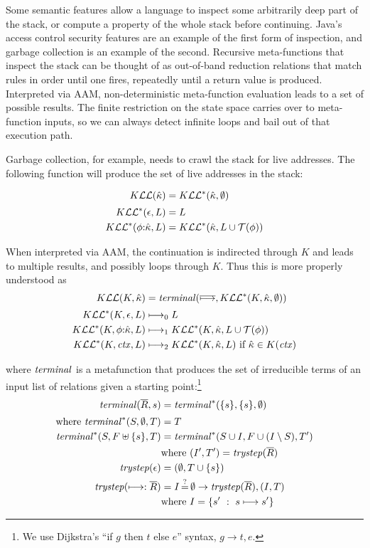 Some semantic features allow a language to inspect some arbitrarily deep part of the stack, or compute a property of the whole stack before continuing.
%
Java's access control security features are an example of the first form of inspection, and garbage collection is an example of the second.
%
Recursive meta-functions that inspect the stack can be thought of as out-of-band reduction relations that match rules in order until one fires, repeatedly until a return value is produced.
%
Interpreted via AAM, non-deterministic meta-function evaluation leads to a set of possible results.
%
The finite restriction on the state space carries over to meta-function inputs, so we can always detect infinite loops and bail out of that execution path.

Garbage collection, for example, needs to crawl the stack for live addresses.
The following function will produce the set of live addresses in the stack:

\begin{align*}
  K{\mathcal L}{\mathcal L}(\hat{\kappa}) &= K{\mathcal L}{\mathcal L}^*(\hat{\kappa},\emptyset) \\[2pt]
  K{\mathcal L}{\mathcal L}^*(\epsilon,L) &= L \\
  K{\mathcal L}{\mathcal L}^*(\phi{\tt :} \hat{\kappa}, L) &= K{\mathcal L}{\mathcal L}^*(\hat{\kappa}, L\cup{\mathcal T}(\phi))
\end{align*}

When interpreted via AAM, the continuation is indirected through $K$ and leads to multiple results, and possibly loops through $K$.
%
Thus this is more properly understood as
\begin{align*}
  K{\mathcal L}{\mathcal L}(K,\hat{\kappa}) &= \mathit{terminal}(\overline{\longmapsto},K{\mathcal L}{\mathcal L}^*(K,\hat{\kappa},\emptyset)) \\[2pt]
  K{\mathcal L}{\mathcal L}^*(K,\epsilon,L) &\longmapsto_0 L \\
  K{\mathcal L}{\mathcal L}^*(K,\phi{\tt :} \hat{\kappa}, L) &\longmapsto_1 K{\mathcal L}{\mathcal L}^*(K,\hat{\kappa}, L\cup{\mathcal T}(\phi)) \\
  K{\mathcal L}{\mathcal L}^*(K,\mathit{ctx}, L) &\longmapsto_2 K{\mathcal L}{\mathcal L}^*(K,\hat{\kappa},L) \text{ if } \hat{\kappa} \in K(\mathit{ctx})
\end{align*}

where $\mathit{terminal}$ is a metafunction that produces the set of irreducible terms of an input list of relations given a starting point:\footnote{We use Dijkstra's ``if $g$ then $t$ else $e$'' syntax, $g \to t, e$.}
\begin{align*}
  \mathit{terminal}(\overline{R},s) &= \mathit{terminal}^*(\{ s \},\{ s \},\emptyset) \\[2pt]
  \text{where } \mathit{terminal}^*(S, \emptyset, T) &= T \\
   \mathit{terminal}^*(S, F \uplus \{ s \}, T) &= \mathit{terminal}^*(S\cup I, F \cup (I \setminus S), T') \\
   & \text{where } (I',T') = \mathit{trystep}(\overline{R}) \\
   \mathit{trystep}(\epsilon) &= (\emptyset,T\cup\{ s \}) \\
   \mathit{trystep}(\longmapsto:\overline{R}) &= I\operatorname*{\overset{?}{=}}\emptyset \to \mathit{trystep}(\overline{R}), (I, T) \\
    & \text{where } I = \{ s'\ :\ s \longmapsto s'\}
\end{align*}

